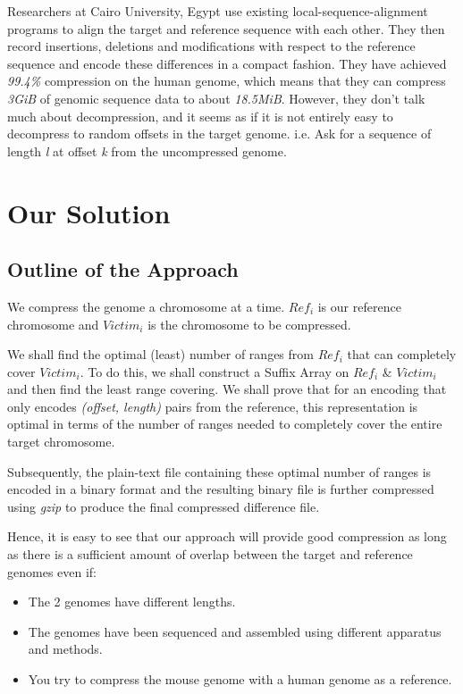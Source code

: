 \documentclass[11pt]{article}
\begin{document}
Researchers at Cairo University, Egypt\cite{cairo} use existing
local-sequence-alignment programs to align the target and reference
sequence with each other. They then record insertions, deletions and
modifications with respect to the reference sequence and encode these
differences in a compact fashion. They have achieved \textit{99.4\%}
compression on the human genome, which means that they can compress
\textit{3GiB} of genomic sequence data to about
\textit{18.5MiB}. However, they don't talk much about decompression,
and it seems as if it is not entirely easy to decompress to random
offsets in the target genome. i.e. Ask for a sequence of length
\textit{l} at offset \textit{k} from the uncompressed genome.

\section{Our Solution}

\subsection{Outline of the Approach}

We compress the genome a chromosome at a time. $Ref_i$ is our
reference chromosome and $Victim_i$ is the chromosome to be
compressed.

We shall find the optimal (least) number of ranges from $Ref_i$ that
can completely cover $Victim_i$. To do this, we shall construct a
Suffix Array on $Ref_i$ \& $Victim_i$ and then find the least range
covering. We shall prove that for an encoding that only encodes
\textit{(offset, length)} pairs from the reference, this
representation is optimal in terms of the number of ranges needed to
completely cover the entire target chromosome.

Subsequently, the plain-text file containing these optimal number of
ranges is encoded in a binary format and the resulting binary file is
further compressed using \textit{gzip} to produce the final compressed
difference file.

Hence, it is easy to see that our approach will provide good
compression as long as there is a sufficient amount of overlap between
the target and reference genomes even if:
\begin{itemize}
\item The 2 genomes have different lengths.
\item The genomes have been sequenced and assembled using different
  apparatus and methods.
\item You try to compress the mouse genome with a human genome as a
  reference.
\end{itemize}
\end{document}
